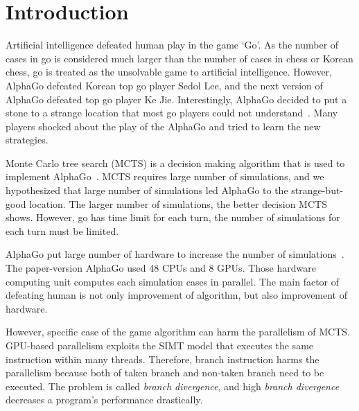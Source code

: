 
\section{Introduction}
 
Artificial intelligence defeated human play in the game `Go'.
As the number of cases in go is considered much larger than the number of cases in chess or Korean chess, go is treated as the unsolvable game to artificial intelligence.
However, AlphaGo defeated Korean top go player Sedol Lee, and the next version of AlphaGo defeated top go player Ke Jie.
Interestingly, AlphaGo decided to put a stone to a strange location that most go players could not understand~\cite{wierd_alphago}.
Many players shocked about the play of the AlphaGo and tried to learn the new strategies.

Monte Carlo tree search (MCTS) is a decision making algorithm that is used to implement AlphaGo~\cite{silver2016mastering_alphago}.
MCTS requires large number of simulations, and we hypothesized that large number of simulations led AlphaGo to the strange-but-good location.
The larger number of simulations, the better decision MCTS shows.
However, go has time limit for each turn, the number of simulations for each turn must be limited.

AlphaGo put large number of hardware to increase the number of simulations~\cite{silver2016mastering_alphago}.
The paper-version AlphaGo used 48 CPUs and 8 GPUs.
Those hardware computing unit computes each simulation cases in parallel.
The main factor of defeating human is not only improvement of algorithm, but also improvement of hardware.

However, specific case of the game algorithm can harm the parallelism of MCTS.
GPU-based parallelism exploits the SIMT model that executes the same instruction within many threads.
Therefore, branch instruction harms the parallelism because both of taken branch and non-taken branch need to be executed.
The problem is called \textit{branch divergence}, and high \textit{branch divergence} decreases a program's performance drastically.

